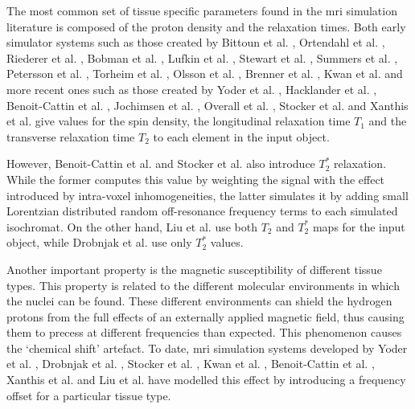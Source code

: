 \hfill

The most common set of tissue specific parameters 
found in the \ac{mri} simulation literature is composed of the proton density and the relaxation times.
Both early simulator systems such as those created by
Bittoun et al. \cite{Bittoun1984},
Ortendahl et al. \cite{Ortendahl1984},
Riederer et al. \cite{Riederer1984},
Bobman et al. \cite{Bobman1985},
Lufkin et al. \cite{Lufkin1986},
Stewart et al. \cite{Stewart1986},
Summers et al. \cite{Summers1986},
Petersson et al. \cite{Petersson1993},
Torheim et al. \cite{Torheim1994}, 
Olsson et al. \cite{Olsson1995},
Brenner et al. \cite{Brenner1997},
Kwan et al. \cite{Kwan1997} and
more recent ones such as those created by
Yoder et al. \cite{Yoder2004},
Hacklander et al. \cite{Hacklander2005},
Benoit-Cattin et al. \cite{Benoit-Cattin2005},
Jochimsen et al. \cite{Jochimsen2004},
Overall et al. \cite{Overall2007},
Stocker et al. \cite{Stocker2010} and
Xanthis et al. \cite{Xanthis2014}
give values for the spin density, the longitudinal relaxation time $T_1$ and the transverse relaxation time $T_2$ to each element in the input object.

\hfill

However, Benoit-Cattin et al. \cite{Benoit-Cattin2005} 
and Stocker et al. \cite{Stocker2010} also introduce $T_2^*$ relaxation.
While the former computes this value by weighting the signal with the effect introduced by intra-voxel inhomogeneities, the latter simulates it by adding small Lorentzian distributed random off-resonance frequency terms to each simulated isochromat.
On the other hand, Liu et al. \cite{Liu2014} use both $T_2$ and $T_2^*$ maps for the input object, while 
Drobnjak et al. \cite{Drobnjak2006} use only $T_2^*$ values.
 
\hfill

Another important property is the magnetic susceptibility of different tissue types.
This property is related to the different molecular environments in which the nuclei can be found.
These different environments can shield the hydrogen protons from the full effects of an externally applied magnetic field, thus causing them to precess at different frequencies than expected.
This phenomenon causes the `chemical shift' artefact.
To date, \ac{mri} simulation systems developed by
Yoder et al. \cite{Yoder2004}, 
Drobnjak et al. \cite{Drobnjak2006}, 
Stocker et al. \cite{Stocker2010}, 
Kwan et al. \cite{Kwan1999}, 
Benoit-Cattin et al. \cite{Benoit-Cattin2005}, 
Xanthis et al. \cite{Xanthis2014} and 
Liu et al. \cite{Liu2013} 
have modelled this effect by 
introducing a frequency offset for a particular tissue type.

